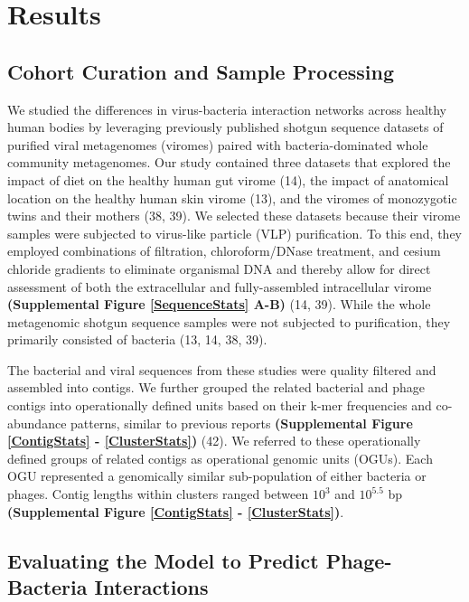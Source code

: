 \documentclass[12pt,]{article}
\begin{document}
\section{Results}\label{results}

\subsection{Cohort Curation and Sample
Processing}\label{cohort-curation-and-sample-processing}

We studied the differences in virus-bacteria interaction networks across
healthy human bodies by leveraging previously published shotgun sequence
datasets of purified viral metagenomes (viromes) paired with
bacteria-dominated whole community metagenomes. Our study contained
three datasets that explored the impact of diet on the healthy human gut
virome (14), the impact of anatomical location on the healthy human skin
virome (13), and the viromes of monozygotic twins and their mothers (38,
39). We selected these datasets because their virome samples were
subjected to virus-like particle (VLP) purification. To this end, they
employed combinations of filtration, chloroform/DNase treatment, and
cesium chloride gradients to eliminate organismal DNA and thereby allow
for direct assessment of both the extracellular and fully-assembled
intracellular virome \textbf{(Supplemental Figure \ref{SequenceStats}
A-B)} (14, 39). While the whole metagenomic shotgun sequence samples
were not subjected to purification, they primarily consisted of bacteria
(13, 14, 38, 39).

The bacterial and viral sequences from these studies were quality
filtered and assembled into contigs. We further grouped the related
bacterial and phage contigs into operationally defined units based on
their k-mer frequencies and co-abundance patterns, similar to previous
reports \textbf{(Supplemental Figure \ref{ContigStats} -
\ref{ClusterStats})} (42). We referred to these operationally defined
groups of related contigs as operational genomic units (OGUs). Each OGU
represented a genomically similar sub-population of either bacteria or
phages. Contig lengths within clusters ranged between \(10^{3}\) and
\(10^{5.5}\) bp \textbf{(Supplemental Figure \ref{ContigStats} -
\ref{ClusterStats})}.

\subsection{Evaluating the Model to Predict Phage-Bacteria
Interactions}\label{evaluating-the-model-to-predict-phage-bacteria-interactions}
\end{document}
